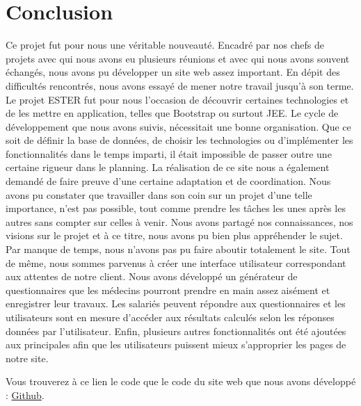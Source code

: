 \chapter*{Conclusion}

Ce projet fut pour nous une véritable nouveauté. Encadré par nos chefs de projets avec qui nous avons eu plusieurs réunions et avec qui nous avons souvent échangés, nous avons pu développer un site web assez important. En dépit des difficultés rencontrés, nous avons essayé de mener notre travail jusqu'à son terme. Le projet ESTER fut pour nous l'occasion de découvrir certaines technologies et de les mettre en application, telles que Bootstrap ou surtout JEE. Le cycle de développement que nous avons suivis, nécessitait une bonne organisation. Que ce soit de définir la base de données, de choisir les technologies ou d'implémenter les fonctionnalités dans le temps imparti, il était impossible de passer outre une certaine rigueur dans le planning. La réalisation de ce site nous a également demandé de faire preuve d'une certaine adaptation et de coordination. 
Nous avons pu constater que travailler dans son coin sur un projet d'une telle importance, n'est pas possible, tout comme prendre les tâches les unes après les autres sans compter sur celles à venir. Nous avons partagé nos connaissances, nos visions sur le projet et à ce titre, nous avons pu bien plus appréhender le sujet. Par manque de temps, nous n'avons pas pu faire aboutir totalement le site. Tout de même, nous sommes parvenus à créer une interface utilisateur correspondant aux attentes de notre client. Nous avons développé un générateur de questionnaires que les médecins pourront prendre en main assez aisément et enregistrer leur travaux. Les salariés peuvent répondre aux questionnaires et les utilisateurs sont en mesure d'accéder aux résultats calculés selon les réponses données par l'utilisateur. Enfin, plusieurs autres fonctionnalités ont été ajoutées aux principales afin que les utilisateurs puissent mieux s'approprier les pages de notre site.


Vous trouverez à ce lien le code que le code du site web que nous avons développé : \href{https://github.com/nordinaryguy/Projet_ESTER}{Github}.